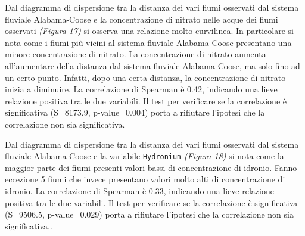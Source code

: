 \documentclass{article} %
\begin{document}
Dal diagramma di dispersione tra la distanza dei vari fiumi osservati dal sistema fluviale Alabama-Coose e la concentrazione di nitrato nelle acque dei fiumi osservati \textit{(Figura 17)} si osserva una relazione molto curvilinea.
In particolare si nota come i fiumi più vicini al sistema fluviale Alabama-Coose presentano una minore concentrazione di nitrato. La concentrazione di nitrato aumenta all'aumentare della distanza dal sistema fluviale Alabama-Coose, ma solo fino ad un certo punto. Infatti, dopo una certa distanza, la concentrazione di nitrato inizia a diminuire.
La correlazione di Spearman è 0.42, indicando una lieve relazione positiva tra le due variabili. 
Il test per verificare se la correlazione è significativa (S=8173.9, p-value=0.004) porta a rifiutare l'ipotesi che la correlazione non sia significativa.

Dal diagramma di dispersione tra la distanza dei vari fiumi osservati dal sistema fluviale Alabama-Coose e la variabile \texttt{Hydronium} \textit{(Figura 18)} si nota come la maggior parte dei fiumi presenti valori bassi di concentrazione di idronio. Fanno eccezione 5 fiumi che invece presentano valori molto alti di concentrazione di idronio. 
La correlazione di Spearman è 0.33, indicando una lieve relazione positiva tra le due variabili. 
Il test per verificare se la correlazione è significativa (S=9506.5, p-value=0.029) porta a rifiutare l'ipotesi che la correlazione non sia significativa,.
\end{document}
